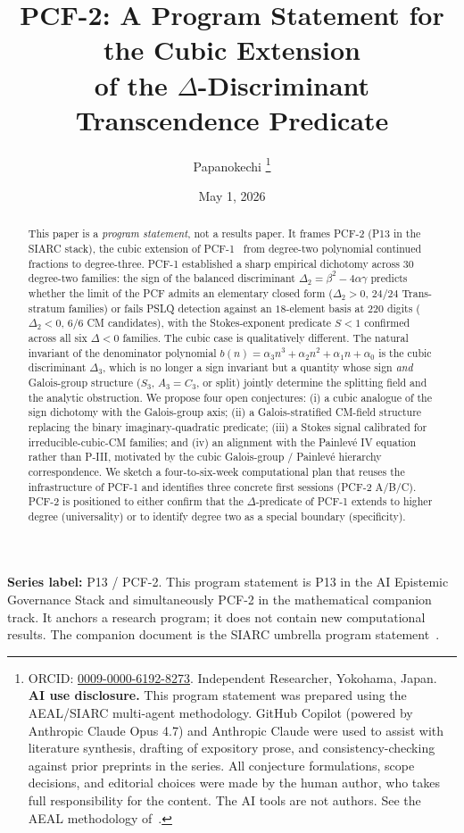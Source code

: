 \documentclass[11pt,a4paper]{article}
\title{PCF-2: A Program Statement for the Cubic Extension\\
       of the $\Delta$-Discriminant Transcendence Predicate}
\author{Papanokechi%
\thanks{ORCID: \href{https://orcid.org/0009-0000-6192-8273}{0009-0000-6192-8273}.
Independent Researcher, Yokohama, Japan.
\textbf{AI use disclosure.} This program statement was prepared using the
AEAL/SIARC multi-agent methodology. GitHub Copilot (powered by Anthropic
Claude Opus 4.7) and Anthropic Claude were used to assist with literature
synthesis, drafting of expository prose, and consistency-checking against
prior preprints in the series. All conjecture formulations, scope
decisions, and editorial choices were made by the human author, who takes
full responsibility for the content. The AI tools are not authors. See the
AEAL methodology of~\cite{P8AEAL}.}}
\date{May 1, 2026}
\theoremstyle{definition}
\theoremstyle{remark}
\begin{document}
\maketitle

\begin{abstract}
This paper is a \emph{program statement}, not a results paper. It frames
PCF-2 (P13 in the SIARC stack), the cubic extension of
PCF-1~\cite{Papanokechi2026PCF1} from degree-two polynomial continued
fractions to degree-three. PCF-1 established a sharp empirical dichotomy
across $30$ degree-two families: the sign of the balanced discriminant
$\Delta_{2}=\beta^{2}-4\alpha\gamma$ predicts whether the limit of the
PCF admits an elementary closed form ($\Delta_{2}>0$, $24/24$ Trans-stratum
families) or fails PSLQ detection against an $18$-element basis at $220$
digits ($\Delta_{2}<0$, $6/6$ CM candidates), with the Stokes-exponent
predicate $S<1$ confirmed across all six $\Delta<0$ families. The cubic
case is qualitatively different. The natural invariant of the denominator
polynomial $b(n)=\alpha_{3}n^{3}+\alpha_{2}n^{2}+\alpha_{1}n+\alpha_{0}$ is
the cubic discriminant $\Delta_{3}$, which is no longer a sign invariant
but a quantity whose sign \emph{and} Galois-group structure
($S_{3}$, $A_{3}=C_{3}$, or split) jointly determine the splitting field
and the analytic obstruction. We propose four open conjectures:
(i) a cubic analogue of the sign dichotomy with the Galois-group axis;
(ii) a Galois-stratified CM-field structure replacing the binary
imaginary-quadratic predicate;
(iii) a Stokes signal calibrated for irreducible-cubic-CM families;
and (iv) an alignment with the Painlev\'e IV equation rather than P-III,
motivated by the cubic Galois-group / Painlev\'e hierarchy correspondence.
We sketch a four-to-six-week computational plan that reuses the
infrastructure of PCF-1 and identifies three concrete first sessions
(PCF-2 A/B/C). PCF-2 is positioned to either confirm that the
$\Delta$-predicate of PCF-1 extends to higher degree (universality) or to
identify degree two as a special boundary (specificity).
\end{abstract}

\noindent\textbf{Series label:} P13 / PCF-2.\;
This program statement is P13 in the AI Epistemic Governance Stack and
simultaneously PCF-2 in the mathematical companion track. It anchors a
research program; it does not contain new computational results. The
companion document is the SIARC umbrella program
statement~\cite{Papanokechi2026UMB}.

\tableofcontents
\end{document}
